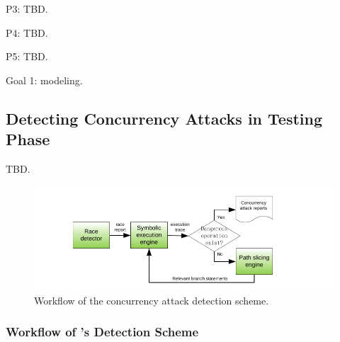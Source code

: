 P3: TBD.

P4: TBD.

P5: TBD.


Goal 1: modeling.

\subsection{Detecting Concurrency Attacks in Testing Phase}\label{sec:detect}

TBD.

\begin{figure}[t]
\centering
\includegraphics[width=0.5\columnwidth]{figures/detection}
\vspace{-.05in}
\caption{{Workflow of the concurrency attack detection scheme.}} 
\label{fig:detection}
\vspace{-.05in}
\end{figure}

\subsubsection{Workflow of \xxx's Detection Scheme}\label{sec:detect-arch}





